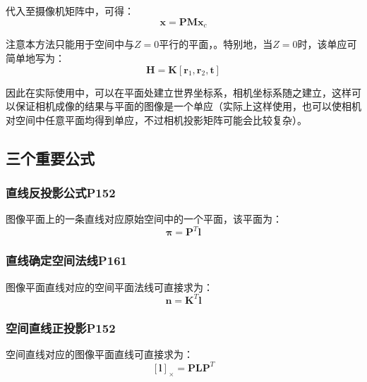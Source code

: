 \documentclass[11pt]{article}
\begin{document}
代入至摄像机矩阵中，可得：
\begin{equation*}
  \mathbf{x}=\mathbf{PMx}_c
\end{equation*}\par
注意本方法只能用于空间中与$Z=0$平行的平面，。特别地，当$Z=0$时，该单应可简单地写为：
\begin{equation*}
  \mathbf{H=K[r_\mathrm{1},r_\mathrm{2},t]}
\end{equation*}\par
因此在实际使用中，可以在平面处建立世界坐标系，相机坐标系随之建立，这样可以保证相机成像的结果与平面的图像是一个单应（实际上这样使用，也可以使相机对空间中任意平面均得到单应，不过相机投影矩阵可能会比较复杂）。
\subsection{三个重要公式}
\subsubsection{直线反投影公式P152}
图像平面上的一条直线对应原始空间中的一个平面，该平面为：
\begin{equation*}
  \mathbold{\pi}=\mathbold{P}^T\mathbold{l}
\end{equation*}
\subsubsection{直线确定空间法线P161}
图像平面直线对应的空间平面法线可直接求为：
\begin{equation*}
  \mathbold{n}=\mathbold{K}^T\mathbold{l}
\end{equation*}
\subsubsection{空间直线正投影P152}
空间直线对应的图像平面直线可直接求为：
\begin{equation*}
  \mathbold{[l]_\times}=\mathbold{P}\mathbold{LP}^T
\end{equation*}
\end{document}
